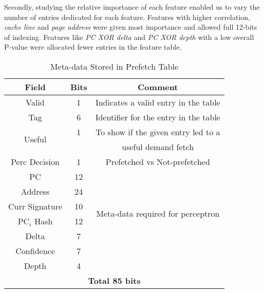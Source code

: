 Secondly, studying the relative importance of each feature enabled us to vary
the number of entries dedicated for each feature. Features with higher
correlation, \textit{cache line} and \textit{page address} were given most
importance and allowed full 12-bits of indexing. Features like \textit{PC XOR
delta} and \textit{PC XOR depth} with a low overall P-value were allocated
fewer entries in the feature table.


\begin{table}[ht]
    \centering
    \begin{adjustbox}{width=0.9\columnwidth}
    \begin{tabular}{|c|c|c|}
    \hline
        \textbf{Field} &
        \textbf{Bits} &
        \textbf{Comment} \\
    \hline
         Valid 		& 1  & Indicates a valid entry in the table\\
         Tag 		& 6  & Identifier for the entry in the table\\
         \multirow{2}{1cm}{Useful} 	& 1  & To show if the given entry led to a\\
                    	&    & useful demand fetch\\
         Perc Decision 	& 1  & Prefetched vs Not-prefetched \\
    \hline
        PC 		& 12 & \\
        Address 	& 24 & \\
        Curr Signature 	& 10 & \multirow{2}{4.8cm}{Meta-data required for perceptron}\\
	PC$_i$ Hash	& 12 & \multirow{2}{1.1cm}{training}\\
        Delta 		& 7  & \\
        Confidence 	& 7  & \\
	Depth		& 4  & \\
    \hline
        \multicolumn{3}{|c|}{\textbf{Total 85 bits}}\\
    \hline
    \end{tabular}
    \end{adjustbox}
    \caption{Meta-data Stored in Prefetch Table}
    \label{tab:PTable_metadata}
\end{table}



